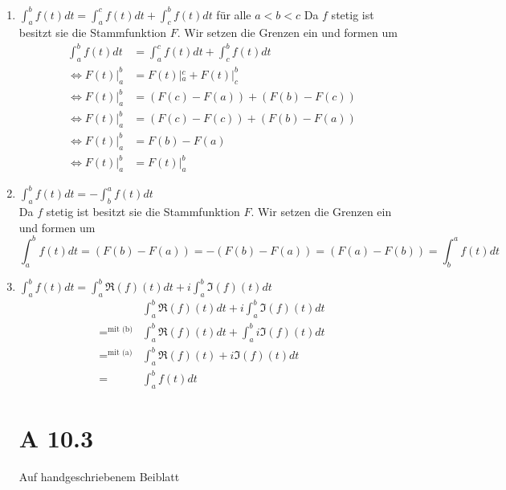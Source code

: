 \documentclass{article}
\begin{document}
\begin{enumerate}[ label = (\alph*) ]
        \item \( \int_a^b f(t) dt = \int_a^c f(t) dt + \int_c^b f(t) dt \) für alle \(a < b < c\)
        Da \(f\) stetig ist besitzt sie die Stammfunktion \(F\). Wir setzen die Grenzen ein und formen um
        \begin{align*}
            \int_a^b f(t) dt &= \int_a^c f(t) dt + \int_c^b f(t) dt \\
            \Leftrightarrow F(t) |_a^b &= F(t) |_a^c + F(t) |_c^b \\
            \Leftrightarrow F(t) |_a^b &= (F(c) - F(a)) + (F(b) - F(c)) \\
            \Leftrightarrow F(t) |_a^b &= (F(c) - F(c)) + (F(b) - F(a)) \\
            \Leftrightarrow F(t) |_a^b &= F(b) - F(a) \\
            \Leftrightarrow F(t) |_a^b &= F(t) |_a^b
        \end{align*}

        \item \(\int_a^b f(t) dt = - \int_b^a f(t) dt\) \\
        Da \(f\) stetig ist besitzt sie die Stammfunktion \(F\). Wir setzen die Grenzen ein und formen um
        \[\int_a^b f(t) dt = (F(b) - F(a)) = -(F(b) - F(a)) = (F(a) - F(b)) = \int_b^a f(t) dt\]

        \item \(\int_a^b f(t) dt = \int_a^b \Re(f)(t) dt + i \int_a^b \Im(f)(t) dt\) \\
        \begin{align*}
            &\int_a^b \Re(f)(t) dt + i \int_a^b \Im(f)(t) dt \\
            =^{\text{mit (b)}} &\int_a^b \Re(f)(t) dt + \int_a^b i \Im(f)(t) dt \\
            =^{\text{mit (a)}} &\int_a^b \Re(f)(t) + i \Im(f)(t) dt \\
            = &\int_a^b f(t) dt
        \end{align*}

        \section*{A 10.3}
        Auf handgeschriebenem Beiblatt


\end{enumerate}
\end{document}
